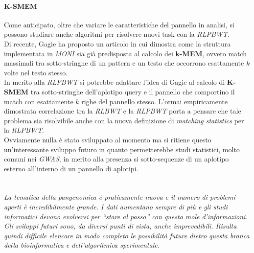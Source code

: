 \paragraph{K-SMEM}
Come anticipato, oltre che variare le caratteristiche del pannello in analisi,
si possono studiare anche algoritmi per risolvere nuovi task con la
\textit{RLPBWT}.\\ 
Di recente, Gagie \cite{kmems} ha proposto un articolo in cui dimostra come
la struttura implementata in \textit{MONI} \cite{moni} sia già predisposta al
calcolo dei \textbf{k-MEM}, ovvero match massimali tra sotto-stringhe di un
pattern e un testo che occorrono esattamente $k$ volte nel testo stesso.\\
In merito alla \textit{RLPBWT} si potrebbe adattare l'idea di Gagie al calcolo
di \textbf{K-SMEM} tra sotto-stringhe dell'aplotipo query e il pannello che
comportino il match con esattamente $k$ righe del pannello stesso. L'ormai
empiricamente dimostrata correlazione tra la \textit{RLBWT} e la \textit{RLPBWT}
porta a pensare che tale problema sia risolvibile anche con la nuova definizione
di \textit{matching statistics} per la \textit{RLPBWT}.\\
Ovviamente nulla è stato sviluppato al momento ma si ritiene questo
un'interessante sviluppo futuro in quanto permetterebbe studi statistici, molto
comuni nei \textit{GWAS}, in merito alla presenza si sotto-sequenze di un
aplotipo esterno all'interno di un pannello di aplotipi.\\
\\
\\
\textit{La tematica della \emph{pangenomica} è praticamente nuova e il numero di
problemi aperti è incredibilmente grande. I dati aumentano sempre di più e gli
studi informatici devono evolversi per ``stare al passo'' con questa mole
d'informazioni. Gli \emph{sviluppi futuri} sono, da diversi punti di vista,
anche imprevedibili. Risulta quindi difficile elencare in modo completo le
possibilità future dietro questa branca della bioinformatica e dell'algoritmica
sperimentale.}
